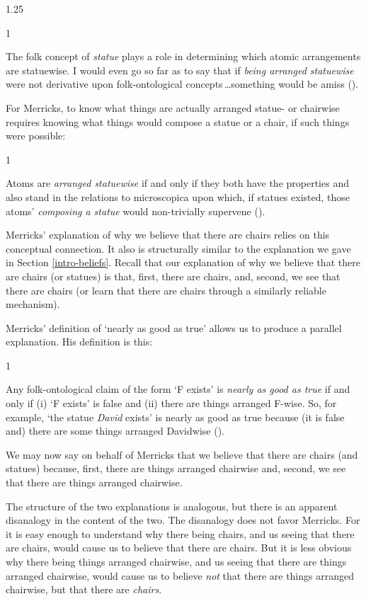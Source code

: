 \documentclass[11pt]{article}
\newenvironment{squote}{%
\begin{spacing}{1}
       	\begin{list}{}{%
\setlength{\labelwidth}{0pt}%
\rightmargin\leftmargin%
}
\item\relax
}{%
\end{list}%
\end{spacing}
}
\begin{document}
\begin{spacing}{1.25}
\begin{squote}
The folk concept of \emph{statue} plays a role in determining which
atomic arrangements are statuewise. I would even go so far as to say
that if \emph{being arranged statuewise} were not derivative upon
folk-ontological concepts\,\ldots something would be amiss
(\citeyear[8]{merricks2001a}).
\end{squote}

For Merricks, to know what things are actually arranged statue- or
chairwise requires knowing what things would compose a statue or a
chair, if such things were possible:

\begin{squote}
Atoms are \emph{arranged statuewise} if and only if they both have the
properties and also stand in the relations to microscopica upon which,
if statues existed, those atoms' \emph{composing a statue} would
non-trivially supervene (\citeyear[4]{merricks2001a}).
\end{squote}

Merricks' explanation of why we believe that there are chairs relies
on this conceptual connection.  It also is structurally similar to the
explanation we gave in Section \ref{intro-beliefs}.  Recall that our
explanation of why we believe that there are chairs (or statues) is
that, first, there are chairs, and, second, we see that there are
chairs (or learn that there are chairs through a similarly reliable
mechanism).

Merricks' definition of `nearly as good as true' allows us to produce
a parallel explanation.  His definition is this:

\begin{squote}
Any folk-ontological claim of the form `F exists' is \emph{nearly as
  good as true} if and only if (i) `F exists' is false and (ii) there
are things arranged F-wise. So, for example, `the statue \emph{David}
exists' is nearly as good as true because (it is false and) there are
some things arranged Davidwise (\citeyear[171]{merricks2001a}).
\end{squote}

We may now say on behalf of Merricks that we believe that there are
chairs (and statues) because, first, there are things arranged
chairwise and, second, we see that there are things arranged
chairwise.

The structure of the two explanations is analogous, but there is an
apparent disanalogy in the content of the two.  The disanalogy does
not favor Merricks.  For it is easy enough to understand why there
being chairs, and us seeing that there are chairs, would cause us to
believe that there are chairs.  But it is less obvious why there being
things arranged chairwise, and us seeing that there are things
arranged chairwise, would cause us to believe {\em not} that there are
things arranged chairwise, but that there are {\em chairs}.


\end{spacing}
\end{document}
